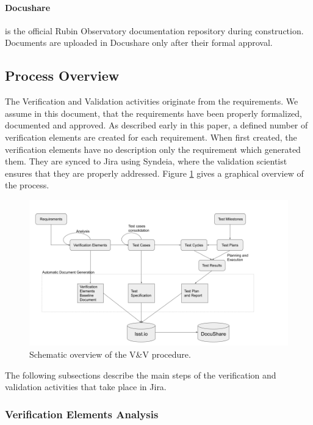 \paragraph{Docushare}
is the official Rubin Observatory documentation repository during construction.
Documents are uploaded in Docushare only after their formal approval.


\subsection{Process Overview}\label{sec:proc}

The Verification and Validation activities originate from the requirements.
We assume in this document, that the requirements have been properly formalized, documented and approved.
As described early in this paper, a defined number of verification elements are created for each requirement.
When first created, the verification elements have no description only the requirement which generated them.
They are synced to Jira using Syndeia, where the validation scientist ensures that they are properly addressed.
Figure  \ref{fig:vandvtools} gives a graphical overview of the process.

\begin{figure}
\begin{center}
\includegraphics[width=\textwidth]{imgs/VandVprocedure.png}
 \caption{Schematic overview of the V\&V procedure.}
 \label{fig:vandvtools}
\end{center}
\end{figure}

The following subsections describe the main steps of the verification and validation activities that take place in Jira.


\subsubsection{Verification Elements Analysis}


